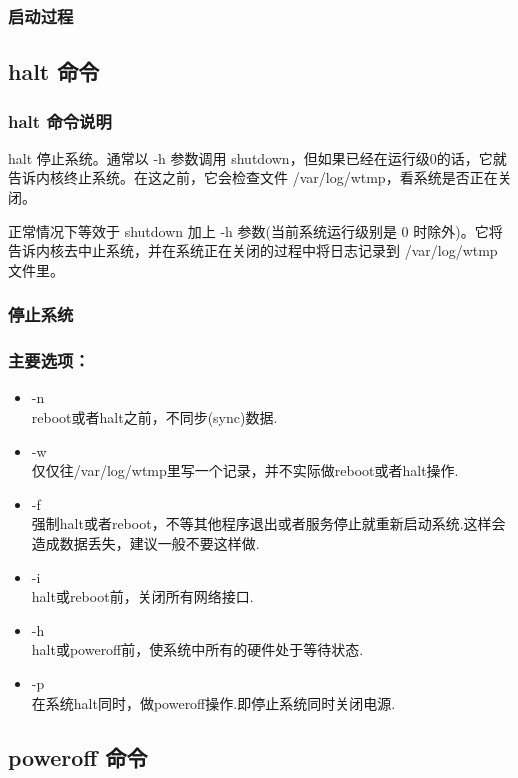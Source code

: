 \subsubsection{启动过程}

\subsection{halt 命令}

\subsubsection{halt 命令说明}

halt 停止系统。通常以 -h 参数调用
shutdown，但如果已经在运行级0的话，它就告诉内核终止系统。在这之前，它会检查文件
/var/log/wtmp，看系统是否正在关闭。

正常情况下等效于 shutdown 加上 -h 参数(当前系统运行级别是 0
时除外)。它将告诉内核去中止系统，并在系统正在关闭的过程中将日志记录到
/var/log/wtmp 文件里。

\subsubsection{停止系统}

\subsubsection{主要选项：}

\begin{itemize}
\item
  -n\\ reboot或者halt之前，不同步(sync)数据.
\item
  -w\\ 仅仅往/var/log/wtmp里写一个记录，并不实际做reboot或者halt操作.
\item
  -f\\
  强制halt或者reboot，不等其他程序退出或者服务停止就重新启动系统.这样会造成数据丢失，建议一般不要这样做.
\item
  -i\\ halt或reboot前，关闭所有网络接口.
\item
  -h\\ halt或poweroff前，使系统中所有的硬件处于等待状态.
\item
  -p\\ 在系统halt同时，做poweroff操作.即停止系统同时关闭电源.
\end{itemize}
\subsection{poweroff 命令}

